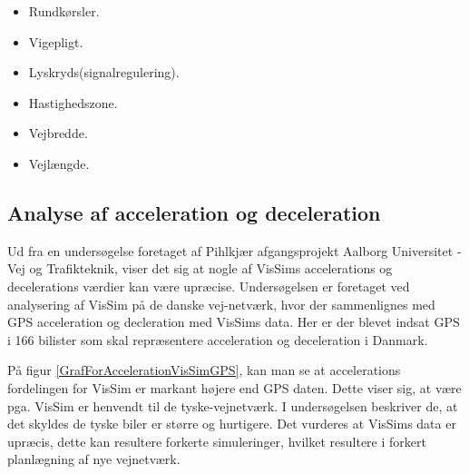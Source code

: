 \begin{itemize}
\item Rundkørsler.
\item Vigepligt.
\item Lyskryds(signalregulering).
\item Hastighedszone.
\item Vejbredde.
\item Vejlængde.
\end{itemize}

\subsection{Analyse af acceleration og deceleration}
Ud fra en undersøgelse foretaget af Pihlkjær afgangsprojekt Aalborg Universitet - Vej og Trafikteknik, viser det sig at nogle af VisSims accelerations og decelerations værdier kan være upræcise. Undersøgelsen er foretaget ved analysering af VisSim på de danske vej-netværk, hvor der sammenlignes med GPS acceleration og decleration med VisSims data. Her er der blevet indsat GPS i 166 bilister som skal repræsentere acceleration og deceleration i Danmark.

På figur \ref{GrafForAccelerationVisSimGPS}, kan man se at accelerations fordelingen for VisSim er markant højere end GPS daten. Dette viser sig, at være pga. VisSim er henvendt til de tyske-vejnetværk. I undersøgelsen beskriver de, at det skyldes de tyske biler er større og hurtigere. Det vurderes at VisSims data er upræcis, dette kan resultere forkerte simuleringer, hvilket resultere i forkert planlægning af nye vejnetværk. 

